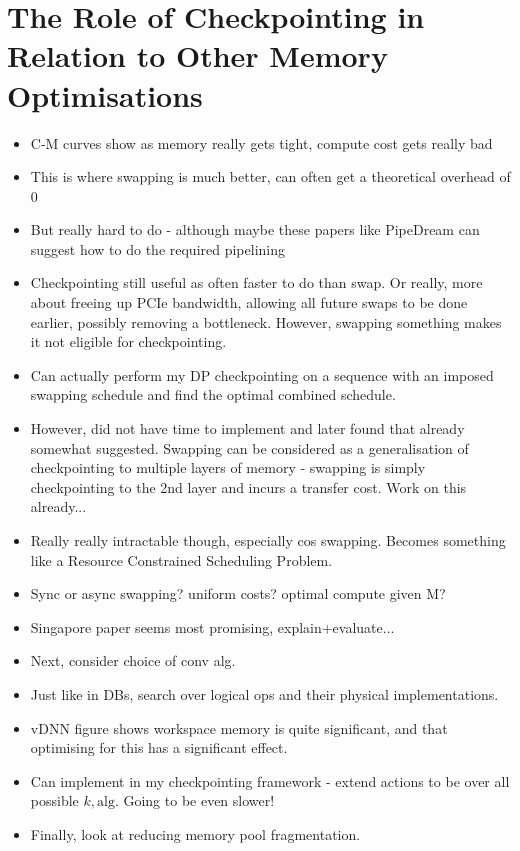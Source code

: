 \section{The Role of Checkpointing in Relation to Other Memory Optimisations}
\begin{itemize}[topsep=0.2em]
    \item C-M curves show as memory really gets tight, compute cost gets really bad
    \item This is where swapping is much better, can often get a theoretical overhead of 0
    \item But really hard to do - although maybe these papers like PipeDream can suggest how to do the required pipelining
    \item Checkpointing still useful as often faster to do than swap. Or really, more about freeing up PCIe bandwidth, allowing all future swaps to be done earlier, possibly removing a bottleneck. However, swapping something makes it not eligible for checkpointing.
    \item Can actually perform my DP checkpointing on a sequence with an imposed swapping schedule and find the optimal combined schedule.
    \item However, did not have time to implement and later found that already somewhat suggested.
    Swapping can be considered as a generalisation of checkpointing to multiple layers of memory - swapping is simply checkpointing to the 2nd layer and incurs a transfer cost. Work on this already...
    \item Really really intractable though, especially cos swapping. Becomes something like a Resource Constrained Scheduling Problem.
    \item Sync or async swapping? uniform costs? optimal compute given M?
    \item Singapore paper seems most promising, explain+evaluate...
    \item Next, consider choice of conv alg.
    \item Just like in DBs, search over logical ops and their physical implementations.
    \item vDNN figure shows workspace memory is quite significant, and that optimising for this has a significant effect.
    \item Can implement in my checkpointing framework - extend actions to be over all possible \(k, \mathrm{alg}\). Going to be even slower!
    \item Finally, look at reducing memory pool fragmentation.

\end{itemize}
